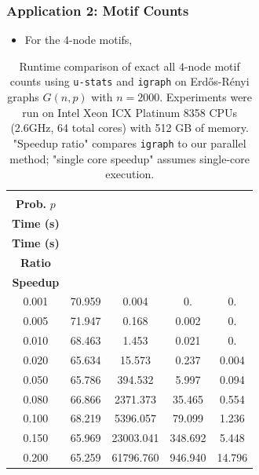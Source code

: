 \documentclass[9pt]{beamer}
\theoremstyle{mystyle}
\theoremstyle{mystyletwo}
\begin{document}
\begin{frame}
    \frametitle{Application 2: Motif Counts}

    \begin{itemize}
        \item For the 4-node motifs,
    \end{itemize}
    \begin{table}
        \centering
        \caption{
            Runtime comparison of exact all $4$-node motif counts using \texttt{u-stats} and \texttt{igraph} on Erdős-Rényi graphs $G(n, p)$ with $n = 2000$.
            Experiments were run on Intel Xeon ICX Platinum 8358 CPUs (2.6GHz, 64 total cores) with 512 GB of memory.
            "Speedup ratio" compares \texttt{igraph} to our parallel method; "single core speedup" assumes single-core execution.
        }
        \label{tab:motif_counts_4}
        \begin{tabular}{ccccc}
            \toprule
            \makecell{\textbf{Edge}                       \\ \textbf{Prob.} $p$} & \makecell{\textbf{\texttt{u-stats}} \\ \textbf{Time (s)}} & \makecell{\textbf{\texttt{igraph}} \\ \textbf{Time (s)}} &\makecell{\textbf{Speedup} \\ \textbf{Ratio}} &  \makecell{\textbf{Single-Core} \\ \textbf{Speedup}} \\
            \midrule
            0.001 & 70.959 & 0.004     & 0.      & 0.     \\
            0.005 & 71.947 & 0.168     & 0.002   & 0.     \\
            0.010 & 68.463 & 1.453     & 0.021   & 0.     \\
            0.020 & 65.634 & 15.573    & 0.237   & 0.004  \\
            0.050 & 65.786 & 394.532   & 5.997   & 0.094  \\
            0.080 & 66.866 & 2371.373  & 35.465  & 0.554  \\
            0.100 & 68.219 & 5396.057  & 79.099  & 1.236  \\
            0.150 & 65.969 & 23003.041 & 348.692 & 5.448  \\
            0.200 & 65.259 & 61796.760 & 946.940 & 14.796 \\
            \bottomrule
        \end{tabular}
    \end{table}
\end{frame}
\end{document}
